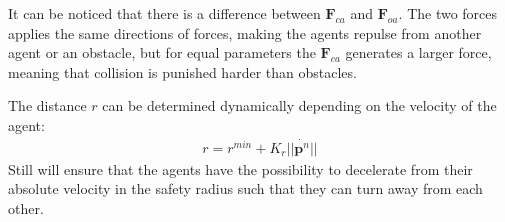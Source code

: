 \documentclass[conference]{IEEEtran}
\begin{document}
It can be noticed that there is a difference between $\mathbf{F}_{ca}$
and $\mathbf{F}_{oa}$. The two forces applies the same directions of
forces, making the agents repulse from another agent or an obstacle, but for equal parameters the $\mathbf{F}_{ca}$ generates a larger force, meaning that collision is punished harder than obstacles. 




The distance $r$ can be determined
dynamically depending on the velocity of the agent:
\begin{align}
r = r^{min} + K_r||\dot{\mathbf{p}^n}||
\end{align}
Still will ensure that the agents have the possibility to decelerate
from their absolute velocity in the safety radius such that they can
turn away from each other.
\end{document}
